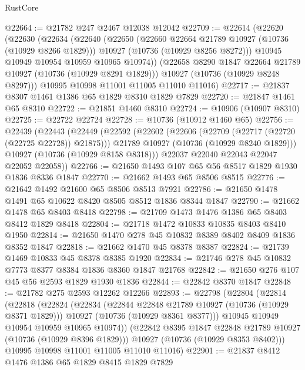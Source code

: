 \begin{lexlean}{RustCore}
\begin{coremodule}
@22664 := @21782 @247 @2467 @12038 @12042
@22709 := @22614
    (@22620
      (@22630
        (@22634
          (@22640
            (@22650
              (@22660 @22664 @21789 @10927 (@10736 (@10929 @8266 @1829)))
              @10927
              (@10736 (@10929 @8256 @8272)))
            @10945
            @10949
            @10954
            @10959
            @10965
            @10974))
        (@22658 @8290 @1847 @22664 @21789 @10927 (@10736 (@10929 @8291 @1829)))
        @10927
        (@10736 (@10929 @8248 @8297)))
      @10995
      @10998
      @11001
      @11005
      @11010
      @11016)
@22717 := @21837 @8307 @1461 @1386 @65 @1829 @8310 @1829 @7829
@22720 := @21847 @1461 @65 @8310
@22722 := @21851 @1460 @8310
@22724 := @10906 (@10907 @8310)
@22725 := @22722 @22724
@22728 := @10736 (@10912 @1460 @65)
@22756 := @22439
    (@22443
      (@22449
        (@22592
          (@22602
            (@22606 (@22709 (@22717 (@22720 (@22725 @22728)) @21875)))
            @21789
            @10927
            (@10736 (@10929 @8240 @1829)))
          @10927
          (@10736 (@10929 @8158 @8318)))
        @22037
        @22040
        @22043
        @22047
        @22052
        @22058))
@22766 := @21650 @1493 @107 @65 @56 @8517 @1829 @1930 @1836 @8336 @1847
@22770 := @21662 @1493 @65 @8506 @8515
@22776 := @21642 @1492 @21600 @65 @8506 @8513 @7921
@22786 := @21650 @1478 @1491 @65 @10622 @8420 @8505 @8512 @1836 @8344 @1847
@22790 := @21662 @1478 @65 @8403 @8418
@22798 := @21709 @1473 @1476 @1386 @65 @8403 @8412 @1829 @8418
@22804 := @21718 @1472 @10833 @10835 @8403 @8410 @1950
@22814 := @21650 @1470 @278 @45 @10832 @8389 @8402 @8409 @1836 @8352 @1847
@22818 := @21662 @1470 @45 @8378 @8387
@22824 := @21739 @1469 @10833 @45 @8378 @8385 @1920
@22834 := @21746 @278 @45 @10832 @7773 @8377 @8384 @1836 @8360 @1847 @21768
@22842 := @21650 @276 @107 @45 @56 @2593 @1829 @1930 @1836
@22844 := @22842 @8370 @1847
@22848 := @21782 @275 @2593 @12262 @12266
@22893 := @22798
    (@22804
      (@22814
        (@22818
          (@22824
            (@22834
              (@22844 @22848 @21789 @10927 (@10736 (@10929 @8371 @1829)))
              @10927
              (@10736 (@10929 @8361 @8377)))
            @10945
            @10949
            @10954
            @10959
            @10965
            @10974))
        (@22842 @8395 @1847 @22848 @21789 @10927 (@10736 (@10929 @8396 @1829)))
        @10927
        (@10736 (@10929 @8353 @8402)))
      @10995
      @10998
      @11001
      @11005
      @11010
      @11016)
@22901 := @21837 @8412 @1476 @1386 @65 @1829 @8415 @1829 @7829

\end{coremodule}
\end{lexlean}
